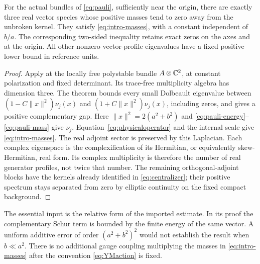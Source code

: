 \begin{proposition}\label{prop:vectors}
For the actual bundles of \eqref{eq:pauli}, sufficiently near the
origin, there are exactly three real vector species whose positive
masses tend to zero away from the unbroken kernel. They satisfy
\eqref{eq:intro-masses}, with a constant independent of $b/a$.
The corresponding two-sided inequality retains exact zeros on the
axes and at the origin. All other nonzero vector-profile eigenvalues
have a fixed positive lower bound in reference units.
\end{proposition}
\begin{proof}
Apply \cite[Theorem~1.1(ii)]{wuebben15} at the locally free polystable
bundle $A\otimes\mathbb C^2$, at constant polarization and fixed
determinant. Its trace-free multiplicity algebra has dimension three.
The theorem bounds every small Dolbeault eigenvalue between
$(1-C\|x\|^2)\nu_j(x)$ and $(1+C\|x\|^2)\nu_j(x)$,
including zeros, and gives a positive complementary gap. Here
$\|x\|^2=2(a^2+b^2)$ and \eqref{eq:pauli-energy}--\eqref{eq:pauli-mass}
give $\nu_j$. Equation~\eqref{eq:physicaloperator} and the internal
scale give \eqref{eq:intro-masses}. The real adjoint sector is preserved
by this Laplacian. Each complex eigenspace is the complexification of
its Hermitian, or equivalently skew-Hermitian, real form. Its complex
multiplicity is therefore the number of real generator profiles,
not twice that number. The remaining orthogonal-adjoint blocks have
the kernels already identified in \eqref{eq:centralizer}; their
positive spectrum stays separated from zero by elliptic continuity
on the fixed compact background.
\end{proof}

The essential input is the relative form of the imported estimate.
In its proof the complementary Schur term is bounded by the finite
energy of the same vector. A uniform additive error of order
$(a^2+b^2)^2$ would not establish the result when $b\ll a^2$.
There is no additional gauge coupling multiplying the masses in
\eqref{eq:intro-masses} after the convention \eqref{eq:YMaction} is fixed.

